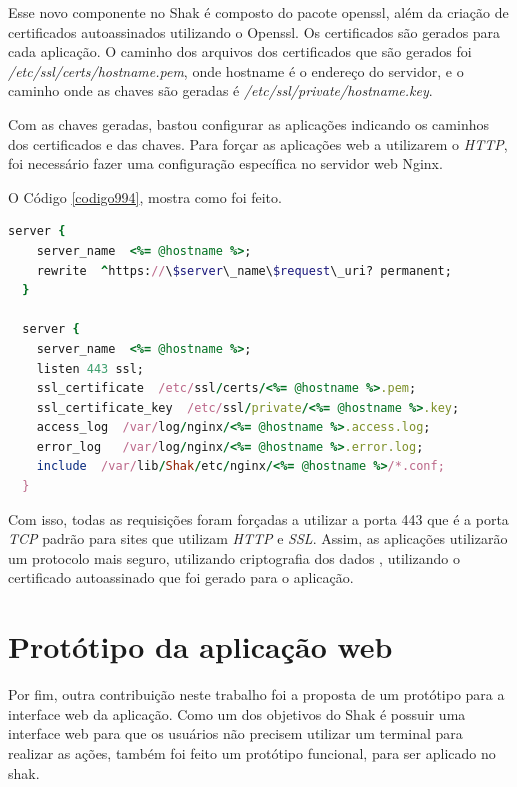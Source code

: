 Esse novo componente no Shak é composto do pacote openssl, além da criação
de certificados autoassinados utilizando o Openssl. Os certificados são gerados 
para cada aplicação. O caminho dos arquivos dos certificados que 
são gerados foi \textit{/etc/ssl/certs/hostname.pem}, onde hostname é o endereço 
do servidor,
e o caminho onde as chaves são geradas é \textit{/etc/ssl/private/hostname.key}.

Com as chaves geradas, bastou configurar as aplicações indicando os caminhos dos certificados
e das chaves. Para forçar as aplicações web a utilizarem o \textit{HTTP}, foi necessário fazer
uma configuração específica no servidor web Nginx. 

O Código \ref{codigo994}, mostra como foi feito.

\begin{lstlisting}[basicstyle=\ttfamily,language=Ruby,label=dice_index,caption={Exemplo de arquivo de configuração do Nginx para aplicações web no shak}, label=codigo994]
  server {
    server_name  <%= @hostname %>;
    rewrite  ^https://\$server\_name\$request\_uri? permanent;
  }

  server {
    server_name  <%= @hostname %>;
    listen 443 ssl;
    ssl_certificate  /etc/ssl/certs/<%= @hostname %>.pem;
    ssl_certificate_key  /etc/ssl/private/<%= @hostname %>.key;
    access_log  /var/log/nginx/<%= @hostname %>.access.log;
    error_log   /var/log/nginx/<%= @hostname %>.error.log;
    include  /var/lib/Shak/etc/nginx/<%= @hostname %>/*.conf;
  }
\end{lstlisting}

Com isso, todas as requisições foram forçadas a utilizar a porta 443 que é a porta
\textit{TCP} padrão para sites que utilizam \textit{HTTP} e \textit{SSL}. Assim, 
as aplicações utilizarão um protocolo mais seguro, utilizando criptografia dos dados
, utilizando o certificado autoassinado que foi gerado para o aplicação.

\section{Protótipo da aplicação web}
\label{sub:prototipo}

Por fim, outra contribuição neste trabalho foi a proposta de um protótipo para a interface
web da aplicação. Como um dos objetivos do Shak é possuir uma interface web para que
os usuários não precisem utilizar um terminal para realizar as ações, também foi
feito um protótipo funcional, para ser aplicado no shak. 

